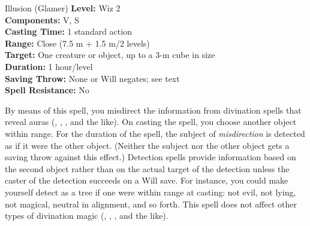 {Illusion (Glamer)}
{
	\textbf{Level:}
	Wiz 2\\
	\textbf{Components:}
	V, S\\
	\textbf{Casting Time:}
	1 standard action\\
	\textbf{Range:}
	Close (7.5 m + 1.5 m/2 levels)\\
	\textbf{Target:}
	One creature or object, up to a 3-m cube in size\\
	\textbf{Duration:}
	1 hour/level\\
	\textbf{Saving Throw:}
	None or Will negates; see text\\
	\textbf{Spell Resistance:}
	No\\
}
{
	By means of this spell, you misdirect the information from divination spells that reveal auras (, , , and the like). On casting the spell, you choose another object within range. For the duration of the spell, the subject of \emph{misdirection} is detected as if it were the other object. (Neither the subject nor the other object gets a saving throw against this effect.) Detection spells provide information based on the second object rather than on the actual target of the detection unless the caster of the detection succeeds on a Will save. For instance, you could make yourself detect as a tree if one were within range at casting: not evil, not lying, not magical, neutral in alignment, and so forth. This spell does not affect other types of divination magic (, , , and the like).

}
